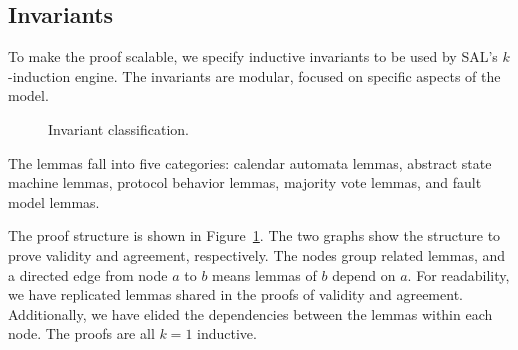 \documentclass{llncs/llncs}
\newcommand{\lee}[1]{ } %
\newcommand{\lee}[1]{ {\color{blue}$<$lee: #1$>$} } %
\begin{document}
\lee{Maybe talk about MJRTY here. Maybe also talk about relaxing in synchronous communication in model.}

\subsection{Invariants}
To make the proof scalable, we specify inductive invariants to be used by SAL's $k$-induction engine. The invariants are modular, focused on specific aspects of the model.







\begin{figure}
  \centering
  \caption{Invariant classification.}
  \label{fig:proof}
\end{figure}

The lemmas fall into five categories: calendar automata lemmas, abstract state machine lemmas, protocol behavior lemmas, majority vote lemmas, and fault model lemmas.


\lee{make clear we're agnostic about human-provided invariants. We conjecture some can be auto-generated. Some might be inferred by IC3.}


The proof structure is shown in Figure~\ref{fig:proof}. The two graphs show the structure to prove validity and agreement, respectively. The nodes group related lemmas, and a directed edge from node $a$ to $b$ means lemmas of $b$ depend on $a$. For readability, we have replicated lemmas shared in the proofs of validity and agreement. Additionally, we have elided the dependencies between the lemmas within each node. The proofs are all $k=1$ inductive.
\end{document}

